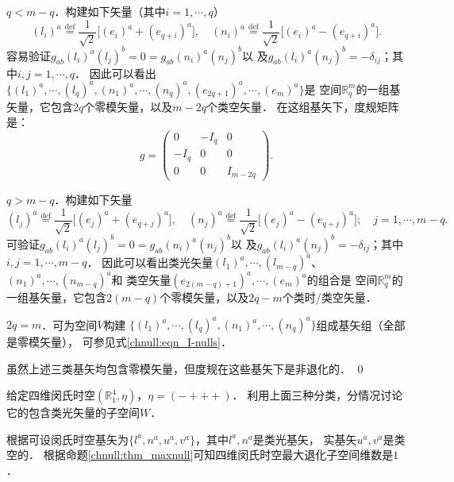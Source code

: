 $q< m-q$．构建如下矢量（其中$i=1,\cdots,q$）
\begin{equation}\label{chnull:eqn_I-nulls}
    (l_i)^a \overset{\mathrm {def}}{=} \frac{1}{\sqrt{2}} \bigl[ (e_{i})^a + (e_{q+i})^a \bigr] ,\quad  
    (n_i)^a \overset{\mathrm {def}}{=} \frac{1}{\sqrt{2}} \bigl[ (e_{i})^a - (e_{q+i})^a \bigr] .
\end{equation}
容易验证$g_{ab}(l_i)^a (l_j)^b=0=g_{ab}(n_i)^a (n_j)^b$以
及$g_{ab}(l_i)^a (n_j)^b=-\delta_{ij}$；其中$i,j=1,\cdots,q$．
因此可以看出$\{(l_1)^a,\cdots,(l_q)^a,(n_1)^a,\cdots,(n_q)^a,(e_{2q+1})^a,\cdots,(e_m)^a\}$是
空间$\mathbb{R}^m_q$的一组基矢量，它包含$2q$个零模矢量，以及$m-2q$个类空矢量．
在这组基矢下，度规矩阵是：
\begin{equation}
    g=\begin{pmatrix}
        0 & -I_q &0 \\
        -I_q & 0 &0 \\
        0& 0 & I_{m-2q}
    \end{pmatrix}.
\end{equation}

$q> m-q$．构建如下矢量
\begin{equation*}%
    (l_j)^a \overset{\mathrm {def}}{=} \frac{1}{\sqrt{2}} \bigl[ (e_{j})^a + (e_{q+j})^a \bigr] ,\quad  
    (n_j)^a \overset{\mathrm {def}}{=} \frac{1}{\sqrt{2}} \bigl[ (e_{j})^a - (e_{q+j})^a \bigr] ;\quad j=1,\cdots,m-q.
\end{equation*}
可验证$g_{ab}(l_i)^a (l_j)^b=0=g_{ab}(n_i)^a (n_j)^b$以
及$g_{ab}(l_i)^a (n_j)^b=-\delta_{ij}$；其中$i,j=1,\cdots,m-q$．
因此可以看出类光矢量$(l_1)^a,\cdots,(l_{m-q})^a$、$ (n_1)^a,\cdots,(n_{m-q})^a$和
类空矢量$(e_{2(m-q)+1})^a,\cdots,(e_m)^a$的组合是
空间$\mathbb{R}^m_q$的一组基矢量，它包含$2(m-q)$个零模矢量，以及$2q-m$个类时/类空矢量．

$2q= m$．可为空间$V$构建
$\{(l_1)^a,\cdots,(l_q)^a,(n_1)^a,\cdots,(n_q)^a\}$组成基矢组（全部是零模矢量），
可参见式\eqref{chnull:eqn_I-nulls}．

虽然上述三类基矢均包含零模矢量，但度规在这些基矢下是非退化的．
\qed

\begin{example}\label{chnull:exm_R41}
    给定四维闵氏时空$(\mathbb{R}^4_1,\eta)$，$\eta=(-+++)$．
    利用上面三种分类，分情况讨论它的包含类光矢量的子空间$W$．
\end{example}

根据可设闵氏时空基矢为$\{l^a,n^a, u^a, v^a\}$，其中$l^a,n^a$是类光基矢，
实基矢$u^a, v^a$是类空的．
根据命题\ref{chnull:thm_maxnull}可知四维闵氏时空最大退化子空间维数是$1$．

